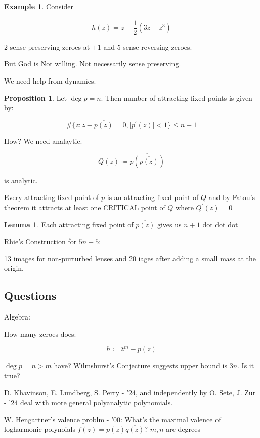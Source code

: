 \documentclass{article}
\theoremstyle{definition}
\newtheorem*{example}{Example}
\newtheorem{proposition}[theorem]{Proposition}
\newtheorem{lemma}[theorem]{Lemma}
\begin{document}
\begin{example}
    Consider

    \[
        h(z) = z - \overline{\frac{1}{2}(3z - z^3)}
    \]

    \(2\) sense preserving zeroes at \(\pm 1\) and \(5\) sense reversing zeroes.
\end{example}

But God is Not willing. Not necessarily sense preserving.

We need help from dynamics.

\begin{proposition}
    Let \(\deg p = n\). Then number of attracting fixed points is given by:

    \[
        \#\{ z : z - \overline{p(z)} = 0, \vert p^{\prime} (z) \vert < 1 \} \leq n-1
    \]

    How? We need analaytic.

    \[
        Q(z) \coloneqq \overline{p(\overline{p(z)} )}
    \]

    is analytic.

    Every attracting fixed point of \(\overline{p} \) is an attracting fixed point of \(Q\) and by Fatou's theorem it attracts at least one CRITICAL point of \(Q\) where \(Q^{\prime} (z) = 0\)
\end{proposition}

\begin{lemma}
    Each attracting fixed point of \(\overline{p(z)} \) gives us \(n+1\) dot dot dot
\end{lemma}

Rhie's Construction for $5n-5$:

13 images for non-purturbed lenses and 20 iages after adding a small mass at the origin.

\subsection*{Questions}

Algebra:

How many zeroes does:

\[
    h \coloneqq \overline{z}^m - p(z)
\]

\(\deg p = n > m\) have? Wilmshurst's Conjecture suggests upper bound is \(3n\). Is it true?

D. Khavinson, E. Lundberg, S. Perry - '24, and independently by O. Sete, J. Zur - '24 deal with more general polyanalytic polynomials.

W. Hengartner's valence problm - '00: What's the maximal valence of logharmonic polynoials \(f(z) = p(z) \overline{q(z)}\)? \(m,n\) are degrees
\end{document}
